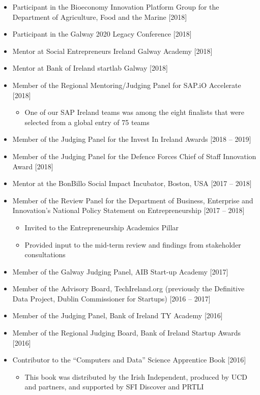\documentclass[10pt,a4paper]{res} %
\begin{document}
\begin{resume}
\begin{itemize}
\item Participant in the Bioeconomy Innovation Platform Group for the Department of Agriculture, Food and the Marine [2018]
\item Participant in the Galway 2020 Legacy Conference [2018]
\item Mentor at Social Entrepreneurs Ireland Galway Academy [2018]
\item Mentor at Bank of Ireland startlab Galway [2018]
\item Member of the Regional Mentoring/Judging Panel for SAP.iO Accelerate [2018]
\begin{itemize} \itemsep -2pt
\item One of our SAP Ireland teams was among the eight finalists that were selected from a global entry of 75 teams
\end{itemize}
\item Member of the Judging Panel for the Invest In Ireland Awards [2018 -- 2019]
\item Member of the Judging Panel for the Defence Forces Chief of Staff Innovation Award [2018]
\item Mentor at the BonBillo Social Impact Incubator, Boston, USA [2017 -- 2018]
\item Member of the Review Panel for the Department of Business, Enterprise and Innovation's National Policy Statement on Entrepreneurship [2017 -- 2018]
\begin{itemize} \itemsep -2pt
\item Invited to the Entrepreneurship Academics Pillar
\item Provided input to the mid-term review and findings from stakeholder consultations
\end{itemize}
\item Member of the Galway Judging Panel, AIB Start-up Academy [2017]
\item Member of the Advisory Board, TechIreland.org (previously the Definitive Data Project, Dublin Commissioner for Startups) [2016 -- 2017]
\item Member of the Judging Panel, Bank of Ireland TY Academy [2016]
\item Member of the Regional Judging Board, Bank of Ireland Startup Awards [2016]
\item Contributor to the ``Computers and Data'' Science Apprentice Book [2016]
\begin{itemize} \itemsep -2pt
\item This book was distributed by the Irish Independent, produced by UCD and partners, and supported by SFI Discover and PRTLI

\end{itemize}
\end{itemize}
\end{resume}
\end{document}
